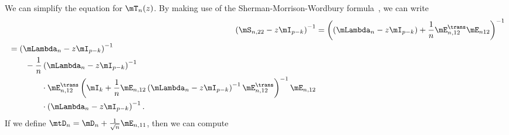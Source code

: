 We can simplify the equation for $\mT_n(z)$.  
By making use of the Sherman-Morrison-Wordbury formula~\cite{golub1996mc}, we can write
\begin{align*}
    \left(
        \mS_{n,22} - z \mI_{p-k}
    \right)^{-1}
        &=
            \left(
                \left(
                    \mLambda_n - z \mI_{p-k}
                \right)
                +
                \frac{1}{n}
                \mE_{n,12}^\trans \mE_{n12}
            \right)^{-1} \\
        \begin{split}
        &=
            \left(
                \mLambda_n
                -
                z
                \mI_{p-k}
            \right)^{-1} \\
            &\qquad-
            \frac{1}{n}
            \left(
                \mLambda_n
                -
                z
                \mI_{p-k}
            \right)^{-1} \\
            &\qquad\qquad\cdot
            \mE_{n,12}^\trans
            \left(
                \mI_k
                +
                \frac{1}{n}
                \mE_{n,12}
                \left(
                    \mLambda_n
                    -
                    z
                    \mI_{p-k}
                \right)^{-1}
                \mE_{n,12}^\trans
            \right)^{-1}
            \mE_{n,12} \\
            &\qquad\qquad\cdot
            \left(
                \mLambda_n
                -
                z
                \mI_{p-k}
            \right)^{-1}.
    \end{split}
\end{align*}
If we define $\mtD_n = \mD_n + \frac{1}{\sqrt{n}} \mE_{n,11}$, then we can compute
